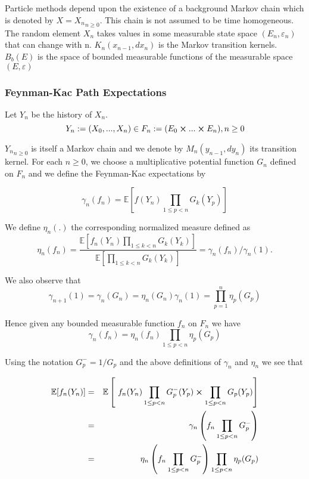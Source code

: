 Particle methods depend upon the existence of a background Markov chain which is denoted by $X = {X_n}_{n\geq 0}$. This chain is not assumed to be time homogeneous. The random element $X_n$ takes values in some measurable state space $(E_n, \varepsilon_n)$ that can change with n. $K_n(x_{n-1}, dx_n)$ is the Markov transition kernels. $B_b(E)$ is the space of bounded measurable functions of the measurable space $(E,\varepsilon)$

\subsubsection{Feynman-Kac Path Expectations}
Let $Y_n$ be the history of $X_n$.
$$Y_n := (X_0,...,X_n) \in F_n := (E_0 \cross ... \cross E_n), n \geq 0$$

${Y_n}_{n\geq 0}$ is itself a Markov chain and we denote by $M_n(y_{n-1},dy_n)$ its transition kernel. For each $n \geq 0$, we choose a multiplicative potential function $G_n$ defined on $F_n$ and we define the Feynman-Kac expectations by

\begin{equation}
	\gamma_n(f_n) = \mathbb{E} \left[ f(Y_n) \prod_{1\leq p<n} G_k(Y_p)\right]
\end{equation}

We define $\eta_n(.)$ the corresponding normalized measure defined as
\begin{equation}
	\eta_n(f_n) = \frac{\mathbb{E}\left[ f_n(Y_n)\prod_{1\leq k<n}G_k(Y_k) \right]}{\mathbb{E}\left[\prod_{1\leq k<n}G_k(Y_k) \right]} = \gamma_n(f_n)/\gamma_n(1).
\end{equation}

We also observe that
$$\gamma_{n+1}(1) = \gamma_n(G_n) = \eta_n(G_n)\gamma_n(1) = \prod_{p=1}^{n}\eta_p(G_p)$$ 

Hence given any bounded measurable function $f_n$ on $F_n$ we have
$$\gamma_n(f_n) = \eta_n(f_n) \prod_{1\leq p<n}\eta_p(G_p)$$

Using the notation $G_p^- = 1/G_p$ and the above definitions of $\gamma_n$ and $\eta_n$ we see that

\begin{eqnarray}
	\mathbb{E}[f_n(Y_n)] & = & \mathbb{E}\left[\ f_n(Y_n) \prod_{1\leq p < n} G_p^-(Y_p) \cross \prod_{1\leq p < n} G_p(Y_p) \right]\\
	& = & \gamma_n\left(  f_n \prod_{1\leq p < n} G_p^- \right)\\
	& = & \eta_n\left(  f_n \prod_{1\leq p < n} G_p^- \right) \prod_{1\leq p < n} \eta_p(G_p)
\end{eqnarray}

